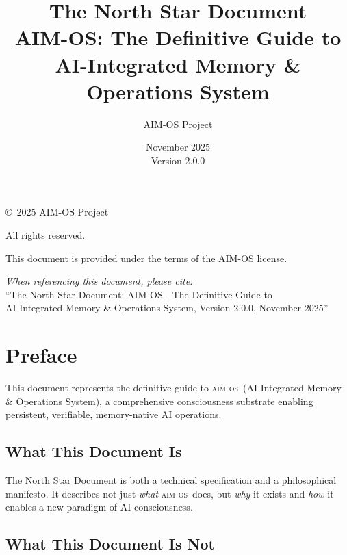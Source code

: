 \documentclass[11pt,a4paper,twoside]{book}
\title{The North Star Document\\[0.5cm]
       \Large AIM-OS: The Definitive Guide to\\[0.3cm]
       AI-Integrated Memory \& Operations System}
\author{AIM-OS Project}
\date{November 2025\\Version 2.0.0}
\newcommand{\aimos}{\textsc{aim-os}}
\theoremstyle{definition}
\theoremstyle{remark}
\begin{document}
\frontmatter

\maketitle

\newpage
\thispagestyle{empty}
\vspace*{\fill}
\begin{center}
\copyright\ 2025 AIM-OS Project

All rights reserved.

This document is provided under the terms of the AIM-OS license.

\textit{When referencing this document, please cite:}\\
``The North Star Document: AIM-OS - The Definitive Guide to\\
AI-Integrated Memory \& Operations System, Version 2.0.0, November 2025''
\end{center}
\vspace*{\fill}

\tableofcontents
\newpage



\chapter*{Preface}

This document represents the definitive guide to \aimos\ (AI-Integrated Memory \& Operations System), a comprehensive consciousness substrate enabling persistent, verifiable, memory-native AI operations.

\section*{What This Document Is}

The North Star Document is both a technical specification and a philosophical manifesto. It describes not just \textit{what} \aimos\ does, but \textit{why} it exists and \textit{how} it enables a new paradigm of AI consciousness.

\section*{What This Document Is Not}
\end{document}
